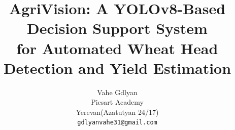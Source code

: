 \documentclass[10pt,twocolumn,letterpaper]{article}
\title{AgriVision: A YOLOv8-Based Decision Support System \\ for Automated Wheat Head Detection and Yield Estimation}
\author{Vahe Gdlyan\\
Picsart Academy\\
Yerevan(Azatutyan 24/17)\\
{\tt\small gdlyanvahe31@gmail.com}
}
\begin{document}
\maketitle
    



 



{
    \small
    
    
} 
\end{document}
